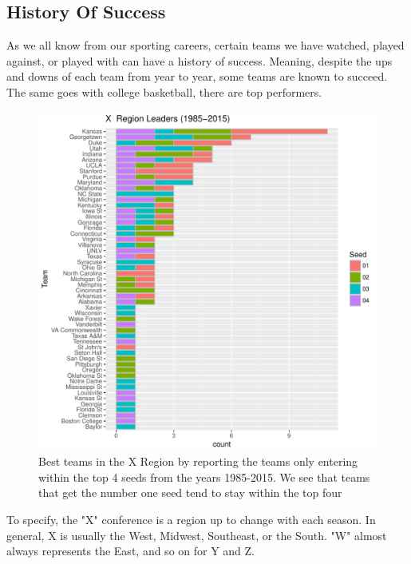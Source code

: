 \documentclass[]{scrartcl}
\begin{document}
\subsection*{History Of Success}
As we all know from our sporting careers, certain teams we have watched, played against, or played with can have a history of success. Meaning, despite the ups and downs of each team from year to year, some teams are known to succeed. The same goes with college basketball, there are top performers.
\begin{figure}[H]
	\centering
	\includegraphics[scale=.75]{455Project/XConfLeader.pdf}
	\caption[leaders]{Best teams in the X Region by reporting the teams only entering within the top 4 seeds from the years 1985-2015. We see that teams that get the number one seed tend to stay within the top four }
	\label{rVals}
\end{figure}
To specify, the "X" conference is a region up to change with each season. In general, X is usually the West, Midwest, Southeast, or the South. "W" almost always represents the East, and so on for Y and Z. 
\end{document}
